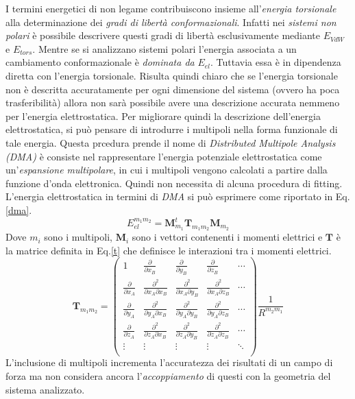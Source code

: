 \documentclass[oneside]{amsbook}
\numberwithin{section}{chapter}
\numberwithin{equation}{section}
\numberwithin{figure}{section}
\begin{document}
I termini energetici di non legame contribuiscono insieme all'\emph{energia torsionale} alla determinazione dei \emph{gradi di libertà conformazionali}. Infatti nei \emph{sistemi non polari} è possibile descrivere questi gradi di libertà esclusivamente mediante $E_{VdW}$ e $E_{tors}$. Mentre se si analizzano sistemi polari l'energia associata a un cambiamento conformazionale è \emph{dominata da } $E_{el}$. Tuttavia essa è in dipendenza diretta con l'energia torsionale. Risulta quindi chiaro che se l'energia torsionale non è descritta accuratamente per ogni dimensione del sistema (ovvero ha poca trasferibilità) allora non sarà possibile avere una descrizione accurata nemmeno per l'energia elettrostatica.
Per migliorare quindi la descrizione dell'energia elettrostatica, si può pensare di introdurre i multipoli nella forma funzionale di tale energia. Questa prcedura prende il nome di \emph{Distributed Multipole Analysis (DMA)} è consiste nel rappresentare l'energia potenziale elettrostatica come un'\emph{espansione multipolare}, in cui i multipoli vengono calcolati a partire dalla funzione d'onda elettronica. Quindi non necessita di alcuna procedura di fitting.
L'energia elettrostatica in termini di \emph{DMA} si può esprimere come riportato in Eq. \ref{dma}.
\begin{equation}
\label{dma}
E_{el}^{m_1m_2}=\textbf{M}_{m_1}^{t}\textbf{T}_{m_1m_2}\textbf{M}_{m_2}
\end{equation}
Dove $m_i$ sono i multipoli, $\textbf{M}_i$ sono i vettori contenenti i momenti elettrici e $\textbf{T}$ è la matrice definita in Eq.\ref{t} che definisce le interazioni tra i momenti elettrici.
\begin{equation}
\label{t}
\textbf{T}_{m_1m_2}=
\begin{pmatrix}
1 & \frac{\partial}{\partial x_B} & \frac{\partial}{\partial y_B}& \frac{\partial}{\partial z_B} &\cdots\\
\frac{\partial}{\partial x_A} & \frac{\partial ^2}{\partial x_A \partial x_B } & \frac{\partial ^2}{\partial x_A \partial y_B } & \frac{\partial ^2}{\partial x_A \partial z_B } & \cdots \\
\frac{\partial}{\partial y_A}  & \frac{\partial ^2}{\partial y_A \partial x_B } & \frac{\partial ^2}{\partial y_A \partial y_B } & \frac{\partial ^2}{\partial y_A \partial z_B } & \cdots \\
 \frac{\partial}{\partial z_A}  & \frac{\partial ^2}{\partial z_A \partial x_B } & \frac{\partial ^2}{\partial z_A \partial y_B } & \frac{\partial ^2}{\partial z_A \partial z_B } & \cdots \\
\vdots    & \vdots & \vdots & \vdots & \ddots \\
\end{pmatrix}
\frac{1}{R^{m_2m_1}}
\end{equation}
L'inclusione di multipoli incrementa l'accuratezza dei risultati di un campo di forza ma non considera ancora l'\emph{accoppiamento} di questi con la geometria del sistema analizzato.
\end{document}
